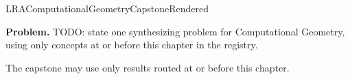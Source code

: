 \ifcsname LRAComputationalGeometryCapstoneRendered\endcsname
\else
\expandafter\gdef\csname LRAComputationalGeometryCapstoneRendered\endcsname{}

\newpage
{}
\label{cap:computational-geometry}

\begin{tcolorbox}[
  colback=gray!6,
  colframe=gray!40,
  arc=2pt,
  left=8pt, right=8pt, top=6pt, bottom=6pt,
  title={\small\textbf{Capstone Problem}},
  fonttitle=\small\bfseries
]
\textbf{Problem.}
TODO: state one synthesizing problem for Computational Geometry, using only concepts at or
before this chapter in the registry.
\end{tcolorbox}

\begin{remark*}
The capstone may use only results routed at or before this chapter.
\end{remark*}

\clearpage
\fi
